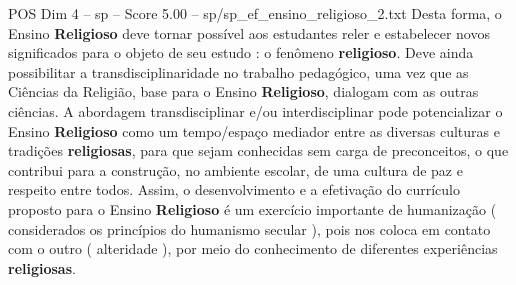 \begin{textsample}{POS Dim 4 – sp – Score 5.00 – sp/sp\_ef\_ensino\_religioso\_2.txt}
Desta forma, o Ensino \textbf{Religioso} deve tornar possível aos estudantes reler e estabelecer novos significados para o objeto de seu estudo : o fenômeno \textbf{religioso}.
Deve ainda possibilitar a transdisciplinaridade no trabalho pedagógico, uma vez que as Ciências da Religião, base para o Ensino \textbf{Religioso}, dialogam com as outras ciências.
A abordagem transdisciplinar e/ou interdisciplinar pode potencializar o Ensino \textbf{Religioso} como um tempo/espaço mediador entre as diversas culturas e tradições \textbf{religiosas}, para que sejam conhecidas sem carga de preconceitos, o que contribui para a construção, no ambiente escolar, de uma cultura de paz e respeito entre todos.
Assim, o desenvolvimento e a efetivação do currículo proposto para o Ensino \textbf{Religioso} é um exercício importante de humanização ( considerados os princípios do humanismo secular ), pois nos coloca em contato com o outro ( alteridade ), por meio do conhecimento de diferentes experiências \textbf{religiosas}.

\end{textsample}
